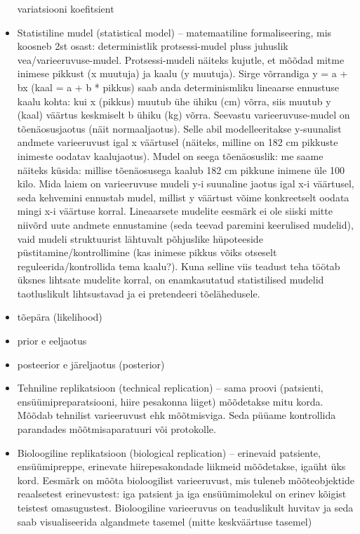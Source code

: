\documentclass[]{book}
\begin{document}
\begin{itemize}
  variatsiooni koefitsient
\item
  Statistiline mudel (statistical model) -- matemaatiline
  formaliseering, mis koosneb 2st osast: deterministlik protsessi-mudel
  pluss juhuslik vea/varieeruvuse-mudel. Protsessi-mudeli näiteks
  kujutle, et mõõdad mitme inimese pikkust (x muutuja) ja kaalu (y
  muutuja). Sirge võrrandiga y = a + bx (kaal = a + b * pikkus) saab
  anda determinismliku lineaarse ennustuse kaalu kohta: kui x (pikkus)
  muutub ühe ühiku (cm) võrra, siis muutub y (kaal) väärtus keskmiselt b
  ühiku (kg) võrra. Seevastu varieeruvuse-mudel on tõenäosusjaotus (näit
  normaaljaotus). Selle abil modelleeritakse y-suunalist andmete
  varieeruvust igal x väärtusel (näiteks, milline on 182 cm pikkuste
  inimeste oodatav kaalujaotus). Mudel on seega tõenäosuslik: me saame
  näiteks küsida: millise tõenäosusega kaalub 182 cm pikkune inimene üle
  100 kilo. Mida laiem on varieeruvuse mudeli y-i suunaline jaotus igal
  x-i väärtusel, seda kehvemini ennustab mudel, millist y väärtust võime
  konkreetselt oodata mingi x-i väärtuse korral. Lineaarsete mudelite
  eesmärk ei ole siiski mitte niivõrd uute andmete ennustamine (seda
  teevad paremini keerulised mudelid), vaid mudeli struktuurist
  lähtuvalt põhjuslike hüpoteeside püstitamine/kontrollimine (kas
  inimese pikkus võiks otseselt reguleerida/kontrollida tema kaalu?).
  Kuna selline viis teadust teha töötab üksnes lihtsate mudelite korral,
  on enamkasutatud statistilised mudelid taotluslikult lihtsustavad ja
  ei pretendeeri tõelähedusele.
\item
  tõepära (likelihood)
\item
  prior e eeljaotus
\item
  posteerior e järeljaotus (posterior)
\item
  Tehniline replikatsioon (technical replication) -- sama proovi
  (patsienti, ensüümipreparatsiooni, hiire pesakonna liiget) mõõdetakse
  mitu korda. Mõõdab tehnilist varieeruvust ehk mõõtmisviga. Seda püüame
  kontrollida parandades mõõtmisaparatuuri või protokolle.
\item
  Bioloogiline replikatsioon (biological replication) -- erinevaid
  patsiente, ensüümipreppe, erinevate hiirepesakondade liikmeid
  mõõdetakse, igaüht üks kord. Eesmärk on mõõta bioloogilist
  varieeruvust, mis tuleneb mõõteobjektide reaalsetest erinevustest: iga
  patsient ja iga ensüümimolekul on erinev kõigist teistest
  omasugustest. Bioloogiline varieeruvus on teaduslikult huvitav ja seda
  saab visualiseerida algandmete tasemel (mitte keskväärtuse tasemel)

\end{itemize}
\end{document}
